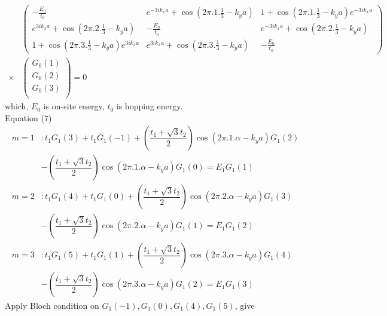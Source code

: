 \documentclass{report}
\newcommand{\f}[2]{\dfrac{#1}{#2}}
\begin{document}
\begin{align*}
	       &
	\begin{pmatrix}
		-\frac{E_{0}}{t_0}                                            & e^{-3i k_x a} + \cos\left( 2\pi.1.\frac{1}{3} - k_ya \right) & 1 + \cos\left( 2\pi.1.\frac{1}{3} - k_ya \right) e^{-3i k_x a} \\
		e^{3i k_x a} + \cos\left( 2\pi.2.\frac{1}{3} - k_ya \right)   & -\frac{E_{0}}{t_0}                                           & e^{-3i k_x a} + \cos\left( 2\pi.2.\frac{1}{3} - k_ya \right)   \\
		1 + \cos\left( 2\pi.3.\frac{1}{3} - k_ya \right) e^{3i k_x a} & e^{3i k_x a} + \cos\left( 2\pi.3.\frac{1}{3} - k_ya \right)  & - \frac{E_{0}}{t_0}
	\end{pmatrix} \\
	\times &
	\begin{pmatrix}
		G_{0}(1) \\
		G_{0}(2) \\
		G_{0}(3) \\
	\end{pmatrix} = 0
\end{align*}
which, $E_{0}$ is on-site energy, $t_0$ is hopping energy. \\
Equation (7)
\begin{align*}
	m = 1 & : t_{1} G_{1}(3) + t_{1} G_{1}(-1) + \left(\f{t_{1} + \sqrt{3}t_{2}}{2}\right)\cos \left(2\pi .1. \alpha - k_y a\right) G_{1}(2) \\
	      & - \left(\f{t_{1} + \sqrt{3}t_{2}}{2}\right)\cos \left(2\pi .1. \alpha - k_y a\right) G_{1}(0) = E_{1} G_{1}(1)                   \\
	m = 2 & : t_{1} G_{1}(4) + t_{1} G_{1}(0) + \left(\f{t_{1} + \sqrt{3}t_{2}}{2}\right)\cos \left(2\pi .2. \alpha - k_y a\right) G_{1}(3)  \\
	      & - \left(\f{t_{1} + \sqrt{3}t_{2}}{2}\right)\cos \left(2\pi .2. \alpha - k_y a\right) G_{1}(1) = E_{1} G_{1}(2)                   \\
	m = 3 & : t_{1} G_{1}(5) + t_{1} G_{1}(1) + \left(\f{t_{1} + \sqrt{3}t_{2}}{2}\right)\cos \left(2\pi .3. \alpha - k_y a\right) G_{1}(4)  \\
	      & - \left(\f{t_{1} + \sqrt{3}t_{2}}{2}\right)\cos \left(2\pi .3. \alpha - k_y a\right) G_{1}(2) = E_{1} G_{1}(3)
\end{align*}
Apply Bloch condition on $G_{1}(-1),G_{1}(0),G_{1}(4),G_{1}(5)$, give
\end{document}
